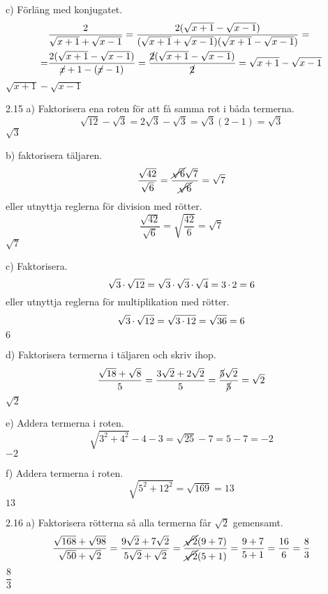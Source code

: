 \begin{task}{c)}
	Förläng med konjugatet.
	\begin{align*}
	&\dfrac{2}{\sqrt{x+1}+\sqrt{x-1}}=
	\dfrac{2(\sqrt{x+1}-\sqrt{x-1})}{(\sqrt{x+1}+\sqrt{x-1})(\sqrt{x+1}-\sqrt{x-1})}= \\ =
	&\dfrac{2(\sqrt{x+1}-\sqrt{x-1})}{\cancel{x}+1-(\cancel{x}-1)}=
	\dfrac{\cancel{2}(\sqrt{x+1}-\sqrt{x-1})}{\cancel{2}}=
	\sqrt{x+1}-\sqrt{x-1}
	\end{align*}
	\ans $\sqrt{x+1}-\sqrt{x-1}$
\end{task}

\begin{task}{2.15 a)}
	Faktorisera ena roten för att få samma rot i båda termerna.
	\[\sqrt{12}-\sqrt{3}=
	2\sqrt{3}-\sqrt{3}=
	\sqrt{3}(2-1)=
	\sqrt{3}\]
	\ans $\sqrt{3}$
\end{task}

\begin{task}{b)}
	faktorisera täljaren.
	\[\dfrac{\sqrt{42}}{\sqrt{6}}=
	\dfrac{\cancel{\sqrt{6}}\sqrt{7}}{\cancel{\sqrt{6}}}=
	\sqrt{7}\]
	eller utnyttja reglerna för division med rötter.
	\[\dfrac{\sqrt{42}}{\sqrt{6}}=\sqrt{\dfrac{42}{6}}=\sqrt{7}\]
	\ans $\sqrt{7}$
\end{task}

\begin{task}{c)}
	Faktorisera.
	\[\sqrt{3}\operatorname{\cdot}\sqrt{12}=
	\sqrt{3}\operatorname{\cdot}\sqrt{3}\operatorname{\cdot}\sqrt{4}=
	3\operatorname{\cdot}2=6\]
	eller utnyttja reglerna för multiplikation med rötter.
	\[\sqrt{3}\operatorname{\cdot}\sqrt{12}=
	\sqrt{3\operatorname{\cdot}12}=
	\sqrt{36}=
	6\]
	\ans $6$
\end{task}

\begin{task}{d)}
	Faktorisera termerna i täljaren och skriv ihop.
	\[\dfrac{\sqrt{18}+\sqrt{8}}{5}=
	\dfrac{3\sqrt{2}+2\sqrt{2}}{5}=
	\dfrac{\cancel{5}\sqrt{2}}{\cancel{5}}=
	\sqrt{2}\]
	\ans $\sqrt{2}$
\end{task}

\begin{task}{e)}
	Addera termerna i roten.
	\[\sqrt{3^2+4^2}-4-3=
	\sqrt{25}-7=
	5-7=
	-2\]
	\ans $-2$
\end{task}

\begin{task}{f)}
	Addera termerna i roten.
	\[\sqrt{5^2+12^2}=\sqrt{169}=13\]
	\ans $13$
\end{task}

\begin{task}{2.16 a)}
	Faktorisera rötterna så alla termerna får $\sqrt{2}$ gemensamt.
	\[\dfrac{\sqrt{168}+\sqrt{98}}{\sqrt{50}+\sqrt{2}}=
	\dfrac{9\sqrt{2}+7\sqrt{2}}{5\sqrt{2}+\sqrt{2}}=
	\dfrac{\cancel{\sqrt{2}}(9+7)}{\cancel{\sqrt{2}}(5+1)}=
	\dfrac{9+7}{5+1}=
	\dfrac{16}{6}=
	\dfrac{8}{3}\]
	\ans $\dfrac{8}{3}$
\end{task}

